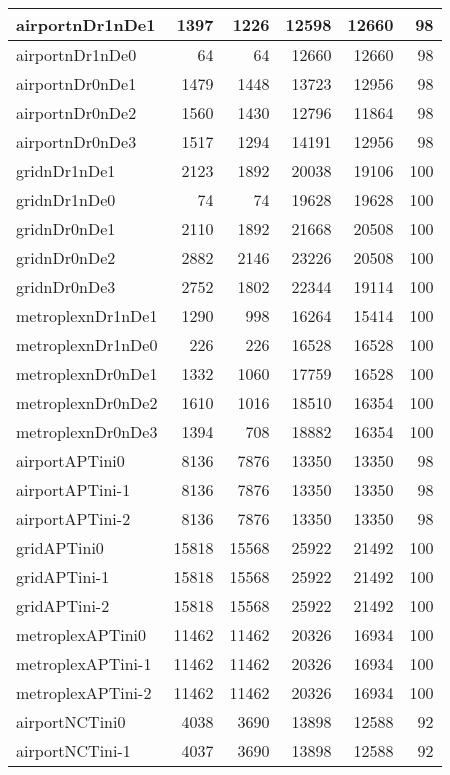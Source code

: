 \begin{longtable}{|l|r|r|r|r|r|}
\endlastfoot
airportnDr1nDe1 & 1397 & 1226 & 12598 & 12660 & 98 \\ \hline
airportnDr1nDe0 & 64 & 64 & 12660 & 12660 & 98 \\ \hline
airportnDr0nDe1 & 1479 & 1448 & 13723 & 12956 & 98 \\ \hline
airportnDr0nDe2 & 1560 & 1430 & 12796 & 11864 & 98 \\ \hline
airportnDr0nDe3 & 1517 & 1294 & 14191 & 12956 & 98 \\ \hline
gridnDr1nDe1 & 2123 & 1892 & 20038 & 19106 & 100 \\ \hline
gridnDr1nDe0 & 74 & 74 & 19628 & 19628 & 100 \\ \hline
gridnDr0nDe1 & 2110 & 1892 & 21668 & 20508 & 100 \\ \hline
gridnDr0nDe2 & 2882 & 2146 & 23226 & 20508 & 100 \\ \hline
gridnDr0nDe3 & 2752 & 1802 & 22344 & 19114 & 100 \\ \hline
metroplexnDr1nDe1 & 1290 & 998 & 16264 & 15414 & 100 \\ \hline
metroplexnDr1nDe0 & 226 & 226 & 16528 & 16528 & 100 \\ \hline
metroplexnDr0nDe1 & 1332 & 1060 & 17759 & 16528 & 100 \\ \hline
metroplexnDr0nDe2 & 1610 & 1016 & 18510 & 16354 & 100 \\ \hline
metroplexnDr0nDe3 & 1394 & 708 & 18882 & 16354 & 100 \\ \hline
airportAPTini0 & 8136 & 7876 & 13350 & 13350 & 98 \\ \hline
airportAPTini-1 & 8136 & 7876 & 13350 & 13350 & 98 \\ \hline
airportAPTini-2 & 8136 & 7876 & 13350 & 13350 & 98 \\ \hline
gridAPTini0 & 15818 & 15568 & 25922 & 21492 & 100 \\ \hline
gridAPTini-1 & 15818 & 15568 & 25922 & 21492 & 100 \\ \hline
gridAPTini-2 & 15818 & 15568 & 25922 & 21492 & 100 \\ \hline
metroplexAPTini0 & 11462 & 11462 & 20326 & 16934 & 100 \\ \hline
metroplexAPTini-1 & 11462 & 11462 & 20326 & 16934 & 100 \\ \hline
metroplexAPTini-2 & 11462 & 11462 & 20326 & 16934 & 100 \\ \hline
airportNCTini0 & 4038 & 3690 & 13898 & 12588 & 92 \\ \hline
airportNCTini-1 & 4037 & 3690 & 13898 & 12588 & 92 \\ \hline

\end{longtable}
